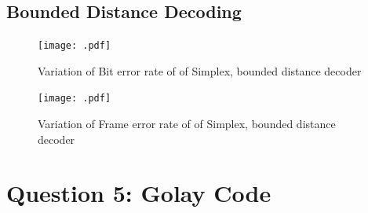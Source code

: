 \documentclass[11pt, english]{article}
\begin{document}
\subsection{Bounded Distance Decoding}
\begin{figure}[H]
    \centering
    \texttt{[image: .pdf]}
    \caption{Variation of Bit error rate of of Simplex, bounded distance decoder}
    \label{sb}
\end{figure}
\begin{figure}[H]
    \centering
    \texttt{[image: .pdf]}
    \caption{Variation of Frame error rate of of Simplex, bounded distance decoder}
    \label{sb}
\end{figure}
\section{Question 5: Golay Code}
\end{document}
